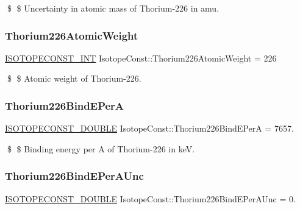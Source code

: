 \$ \$ Uncertainty in atomic mass of Thorium-\/226 in amu. \mbox{\label{group___isotope_const-_thorium-_th226_gae02bbe9483b4757fd609a7f66d85a85b}} 
\subsubsection{\texorpdfstring{Thorium226\+Atomic\+Weight}{Thorium226AtomicWeight}}
{\footnotesize\ttfamily \mbox{\hyperlink{group___isotope_const-_macros_ga5f18360b3e99483a35c32d789e62621c}{I\+S\+O\+T\+O\+P\+E\+C\+O\+N\+S\+T\+\_\+\+I\+NT}} Isotope\+Const\+::\+Thorium226\+Atomic\+Weight = 226}

\$ \$ Atomic weight of Thorium-\/226. \mbox{\label{group___isotope_const-_thorium-_th226_gae1e5e4005ce5219959da76e7ce1961d0}} 
\subsubsection{\texorpdfstring{Thorium226\+Bind\+E\+PerA}{Thorium226BindEPerA}}
{\footnotesize\ttfamily \mbox{\hyperlink{group___isotope_const-_macros_ga8f45a7272ce02c0b4c65c44636ed719a}{I\+S\+O\+T\+O\+P\+E\+C\+O\+N\+S\+T\+\_\+\+D\+O\+U\+B\+LE}} Isotope\+Const\+::\+Thorium226\+Bind\+E\+PerA = 7657.}

\$ \$ Binding energy per A of Thorium-\/226 in keV. \mbox{\label{group___isotope_const-_thorium-_th226_ga4998f9d5b7720f7d4066ed37134dc3e2}} 
\subsubsection{\texorpdfstring{Thorium226\+Bind\+E\+Per\+A\+Unc}{Thorium226BindEPerAUnc}}
{\footnotesize\ttfamily \mbox{\hyperlink{group___isotope_const-_macros_ga8f45a7272ce02c0b4c65c44636ed719a}{I\+S\+O\+T\+O\+P\+E\+C\+O\+N\+S\+T\+\_\+\+D\+O\+U\+B\+LE}} Isotope\+Const\+::\+Thorium226\+Bind\+E\+Per\+A\+Unc = 0.}

